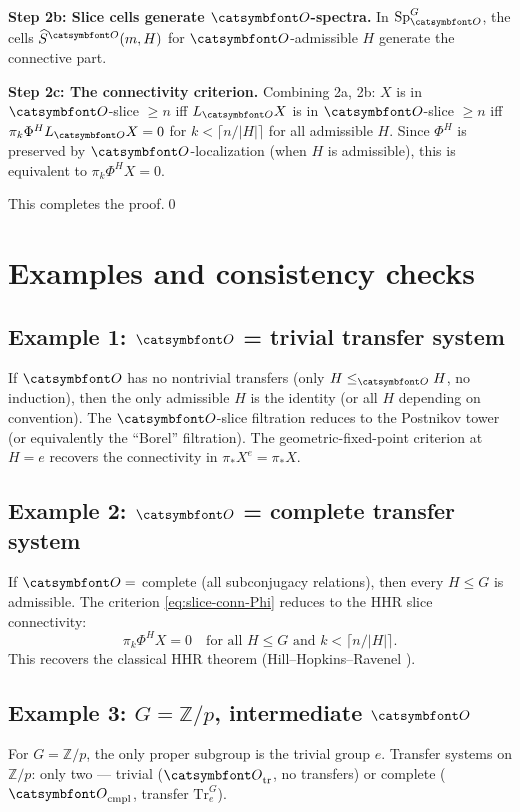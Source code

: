 \noindent\textbf{Step 2b: Slice cells generate $\aO$-spectra.}  In $\mathrm{Sp}^G_\aO$, the cells $\widehat S^\aO(m,H)$ for $\aO$-admissible $H$ generate the connective part.

\noindent\textbf{Step 2c: The connectivity criterion.}  Combining 2a, 2b: $X$ is in $\aO$-slice $\geq n$ iff $L_\aO X$ is in $\aO$-slice $\geq n$ iff $\pi_k\Phi^HL_\aO X=0$ for $k<\lceil n/|H|\rceil$ for all admissible $H$.  Since $\Phi^H$ is preserved by $\aO$-localization (when $H$ is admissible), this is equivalent to $\pi_k\Phi^HX=0$.

\medskip
This completes the proof.\qed

\section*{Examples and consistency checks}

\subsection*{Example 1: $\aO$ = trivial transfer system}

If $\aO$ has no nontrivial transfers (only $H\le_\aO H$, no induction), then the only admissible $H$ is the identity (or all $H$ depending on convention).  The $\aO$-slice filtration reduces to the Postnikov tower (or equivalently the ``Borel'' filtration).  The geometric-fixed-point criterion at $H=e$ recovers the connectivity in $\pi_*X^e=\pi_*X$.

\subsection*{Example 2: $\aO$ = complete transfer system}

If $\aO=$ complete (all subconjugacy relations), then every $H\le G$ is admissible.  The criterion \eqref{eq:slice-conn-Phi} reduces to the HHR slice connectivity:
\[
\pi_k\Phi^HX=0\quad\text{for all }H\le G\text{ and }k<\lceil n/|H|\rceil.
\]
This recovers the classical HHR theorem (Hill--Hopkins--Ravenel \cite[Cor 4.43]{HHR16}).

\subsection*{Example 3: $G=\mathbb Z/p$, intermediate $\aO$}

For $G=\mathbb Z/p$, the only proper subgroup is the trivial group $e$.  Transfer systems on $\mathbb Z/p$: only two — trivial ($\aO_{\rm tr}$, no transfers) or complete ($\aO_{\rm cmpl}$, transfer $\mathrm{Tr}^G_e$).

